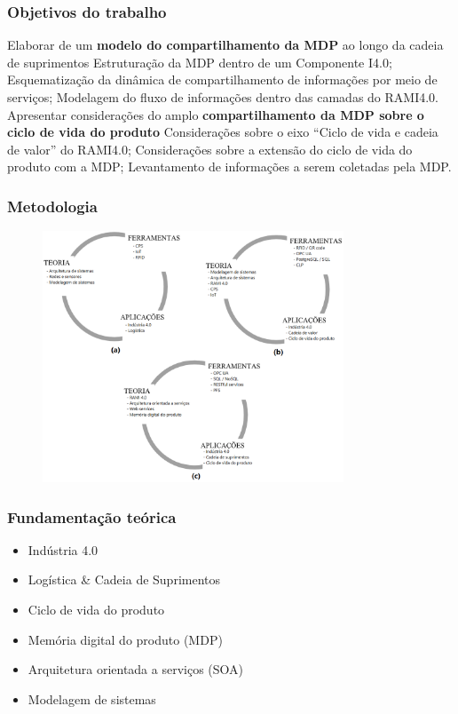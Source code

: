 \documentclass[10pt]{beamer}
\begin{document}
\begin{frame}
	\frametitle{Objetivos do trabalho}
	
	\begin{outline}[enumerate]
		\1 Elaborar de um \textbf{modelo do compartilhamento da MDP} ao longo da cadeia de suprimentos
			\2 Estruturação da MDP dentro de um Componente I4.0;
			\2 Esquematização da dinâmica de compartilhamento de informações por meio de serviços;
			\2 Modelagem do fluxo de informações dentro das camadas do RAMI4.0.
		\1 Apresentar considerações do amplo \textbf{compartilhamento da MDP sobre o ciclo de vida do produto}
			\2 Considerações sobre o eixo ``Ciclo de vida e cadeia de valor'' do RAMI4.0;
			\2 Considerações sobre a extensão do ciclo de vida do produto com a MDP;
			\2 Levantamento de informações a serem coletadas pela MDP.
	\end{outline}

\end{frame}

\begin{frame}
	\frametitle{Metodologia}
	
	\begin{figure}[htb]
		\centering
		\label{fig:metodologia-jensen-projeto}
		\includegraphics[width=0.8\textwidth]{metodologia-jensen-projeto.png}
	\end{figure}
	
\end{frame}
\begin{frame}
	\frametitle{Fundamentação teórica}
	
	\begin{itemize}
		\item Indústria 4.0
		\item Logística \& Cadeia de Suprimentos
		\item Ciclo de vida do produto
		\item Memória digital do produto (MDP)
		\item Arquitetura orientada a serviços (SOA)
		\item Modelagem de sistemas
	\end{itemize}
	
\end{frame}
\end{document}
